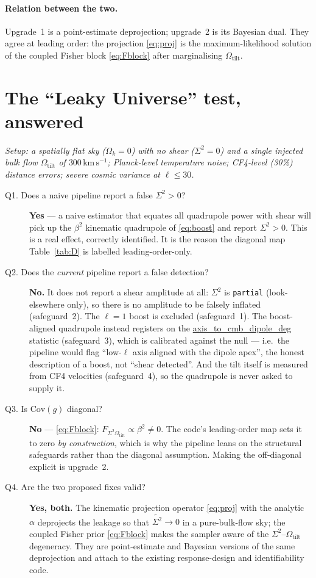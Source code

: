 \documentclass[11pt]{article}
\newcommand{\code}[1]{\texttt{\small #1}}
\newcommand{\pathx}[1]{{\small\urlstyle{tt}\url{#1}}}  %
\newcommand{\Sig}{\Sigma^2}
\newcommand{\Otilt}{\Omega_{\mathrm{tilt}}}
\newcommand{\Ok}{\Omega_{k}}
\newcommand{\Cov}{\mathrm{Cov}}
\begin{document}
\paragraph{Relation between the two.} Upgrade~1 is a point-estimate
deprojection; upgrade~2 is its Bayesian dual. They agree at leading order: the
projection \eqref{eq:proj} is the maximum-likelihood solution of the coupled
Fisher block \eqref{eq:Fblock} after marginalising $\Otilt$.

\section{The ``Leaky Universe'' test, answered}
\label{sec:toy}

\emph{Setup: a spatially flat sky ($\Ok=0$) with no shear ($\Sig=0$) and a single
injected bulk flow $\Otilt$ of $300\,\mathrm{km\,s^{-1}}$; Planck-level
temperature noise; CF4-level (30\%) distance errors; severe cosmic variance at
$\ell\le30$.}

\begin{description}
\item[Q1. Does a naive pipeline report a false $\Sig>0$?] \textbf{Yes} --- a naive
estimator that equates all quadrupole power with shear will pick up the
$\beta^2$ kinematic quadrupole of \eqref{eq:boost} and report $\Sig>0$. This is a
real effect, correctly identified. It is the reason the diagonal map
Table~\ref{tab:D} is labelled leading-order-only.
\item[Q2. Does the \emph{current} pipeline report a false detection?] \textbf{No.}
It does not report a shear amplitude at all: $\Sig$ is \code{partial}
(look-elsewhere only), so there is no amplitude to be falsely inflated
(safeguard~2). The $\ell=1$ boost is excluded (safeguard~1). The
boost-aligned quadrupole instead registers on the \pathx{axis_to_cmb_dipole_deg}
statistic (safeguard~3), which is calibrated against the null --- i.e.\ the
pipeline would flag ``low-$\ell$ axis aligned with the dipole apex'', the honest
description of a boost, not ``shear detected''. And the tilt itself is measured
from CF4 velocities (safeguard~4), so the quadrupole is never asked to supply it.
\item[Q3. Is $\Cov(g)$ diagonal?] \textbf{No} --- \eqref{eq:Fblock}:
$F_{\Sig\Otilt}\propto\beta^2\neq0$. The code's leading-order map sets it to zero
\emph{by construction}, which is why the pipeline leans on the structural
safeguards rather than the diagonal assumption. Making the off-diagonal explicit
is upgrade~2.
\item[Q4. Are the two proposed fixes valid?] \textbf{Yes, both.} The kinematic
projection operator \eqref{eq:proj} with the analytic $\alpha$ deprojects the
leakage so that $\widetilde{\Sig}\to0$ in a pure-bulk-flow sky; the coupled
Fisher prior \eqref{eq:Fblock} makes the sampler aware of the $\Sig$--$\Otilt$
degeneracy. They are point-estimate and Bayesian versions of the same
deprojection and attach to the existing response-design and identifiability code.
\end{description}
\end{document}
